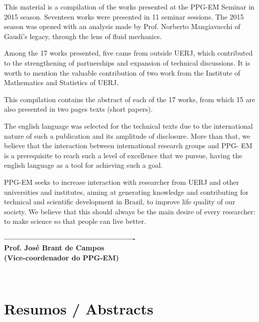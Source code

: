 \documentclass[11pt,a4paper]{book} %
\newcommand{\numpapersen}{15 }
\begin{document}
\begin{minipage}[t]{.55\textwidth}
	This material is a compilation of the works presented at the PPG-EM Seminar in 2015 season. Seventeen works were presented in 11 seminar sessions. The 2015 season was opened with an analysis made by Prof. Norberto Mangiavacchi of Gaudí’s legacy, through the lens of fluid mechanics.
	
	Among the 17 works presented, five came from outside UERJ, which contributed to the strengthening of partnerships and expansion of technical discussions. It is worth to mention the valuable contribution of two work from the Institute of Mathematics and Statistics of UERJ.
	
	This compilation contains the abstract of each of the 17 works, from which \numpapersen are also presented in two pages texts (short papers).
	
	The english language was selected for the technical texts due to the international nature of such a publication and its amplitude of disclosure. More than that, we believe that the interaction between international research groups and PPG- EM is a prerequisite to reach such a level of excellence that we pursue, having the english language as a tool for achieving such a goal. 
	
	PPG-EM seeks to increase interaction with researcher from UERJ and other universities and institutes, aiming at generating knowledge and contributing for technical and scientific development in Brazil, to improve life quality of our society. We believe that this should always be the main desire of every researcher: to make science so that people can live better.\\
	
\vspace*{19.5mm}
\begin{center}
	\textbf{-------------------------------------------------\\
		Prof. José Brant de Campos\\
		(Vice-coordenador do PPG-EM)}
\end{center}
\end{minipage}\\


\chapter{Resumos / Abstracts}
\end{document}
